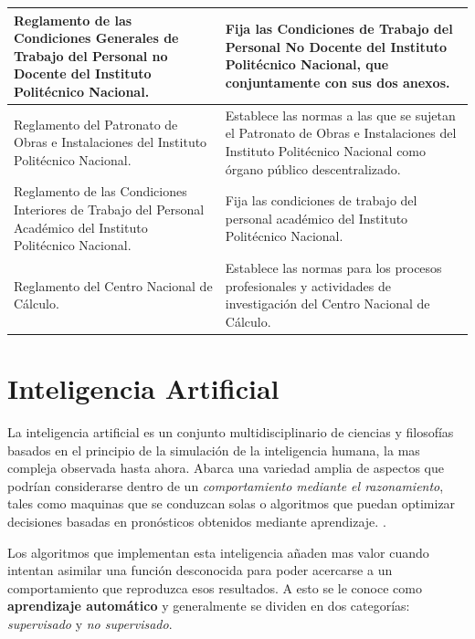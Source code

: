 \begin{tabular}{ | m{17em} | m{25em}|}
    \hline
    Reglamento de las Condiciones Generales de Trabajo del Personal no Docente del Instituto Politécnico Nacional. &  Fija las Condiciones de Trabajo del Personal No Docente del Instituto Politécnico Nacional, que conjuntamente con sus dos anexos. \\
    \hline
    Reglamento del Patronato de Obras e Instalaciones del Instituto Politécnico Nacional. & Establece las normas a las que se sujetan el Patronato de Obras e Instalaciones del Instituto Politécnico Nacional como órgano público descentralizado. \\
    \hline
    Reglamento de las Condiciones Interiores de Trabajo del Personal Académico del Instituto Politécnico Nacional. &  Fija las condiciones de trabajo del personal académico del Instituto Politécnico Nacional. \\
    \hline
    Reglamento del Centro Nacional de Cálculo. & Establece las normas para los procesos profesionales y actividades de investigación del Centro Nacional de Cálculo. \\
    \hline
\end{tabular}

%
%

\section{Inteligencia Artificial}

La inteligencia artificial es un conjunto multidisciplinario de ciencias y filosofías basados en el principio de la simulación de la inteligencia humana, la mas compleja observada hasta ahora. Abarca una variedad amplia de aspectos que podrían considerarse dentro de un \textit{comportamiento mediante el razonamiento}, tales como maquinas que se conduzcan solas o algoritmos que puedan optimizar decisiones basadas en pronósticos obtenidos mediante aprendizaje. \parencite{russelnorvig}.

Los algoritmos que implementan esta inteligencia añaden mas valor cuando intentan asimilar una función desconocida para poder acercarse a un comportamiento que reproduzca esos resultados. A esto se le conoce como \textbf{aprendizaje automático} y generalmente se dividen en dos categorías: \textit{supervisado} y \textit{no supervisado}. \parencite{murphypkevin}


